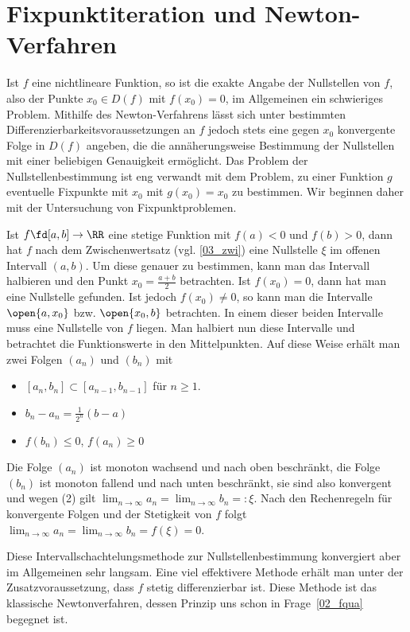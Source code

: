 \section{Fixpunktiteration und Newton-Verfahren}

Ist $f$ eine nichtlineare Funktion, so ist die 
exakte Angabe der Nullstellen von $f$, 
also der Punkte $x_0 \in D(f)$ mit 
$f(x_0)=0$, im Allgemeinen ein schwieriges Problem.  
Mithilfe des Newton-Verfahrens lässt sich unter bestimmten 
Differenzierbarkeitsvoraussetzungen an $f$ jedoch stets eine gegen 
$x_0$ konvergente Folge in $D(f)$ angeben, die die 
annäherungsweise Bestimmung der Nullstellen mit einer beliebigen 
Genauigkeit ermöglicht. Das Problem der Nullstellenbestimmung 
ist eng verwandt mit dem Problem, zu einer Funktion $g$ 
eventuelle Fixpunkte mit $x_0$ mit $g(x_0)=x_0$ zu bestimmen. 
Wir beginnen daher mit der Untersuchung von Fixpunktproblemen. 

Ist $f\fd [a,b] \to \RR$ eine stetige Funktion mit $f(a)<0$ und $f(b)>0$, dann 
hat $f$ nach dem Zwischenwertsatz (vgl. \ref{03_zwi}) eine Nullstelle $\xi$ im offenen 
Intervall $(a,b)$. Um diese genauer zu bestimmen, kann man das Intervall halbieren 
und den Punkt $x_0 = \frac{a+b}{2}$ betrachten. Ist $f(x_0)=0$, dann hat man eine 
Nullstelle gefunden. Ist jedoch $f(x_0) \not=0$, so kann man die Intervalle 
$\open{a,x_0}$ bzw. $\open{x_0, b}$ betrachten. 
In einem dieser beiden Intervalle muss eine Nullstelle von $f$ liegen. 
Man halbiert nun diese Intervalle und betrachtet die Funktionswerte in den 
Mittelpunkten. Auf diese Weise erhält man zwei Folgen 
$(a_n)$ und $(b_n)$ mit 
\begin{itemize}
\item[\desc{1}] $[a_{n},b_{n}] \subset [a_{n-1}, b_{n-1}]$ für $n\ge 1$.
\item[\desc{2}] $b_n-a_n = \frac{1}{2^n} (b-a)$
\item[\desc{3}] $f(b_n) \le 0$, $f(a_n) \ge 0$
\end{itemize}
Die Folge $(a_n)$ ist monoton wachsend und nach oben beschränkt, die Folge $(b_n)$ 
ist monoton fallend und nach unten beschränkt, sie sind also konvergent und 
wegen (2) gilt $\lim_{n\to\infty} a_n = \lim_{n\to\infty} b_n =: \xi$. 
Nach den Rechenregeln für konvergente Folgen und der Stetigkeit von $f$ folgt 
$\lim_{n\to\infty} a_n = \lim_{n\to\infty} b_n = f(\xi) = 0$.  

Diese Intervallschachtelungsmethode zur Nullstellenbestimmung konvergiert aber 
im Allgemeinen sehr langsam. Eine viel effektivere Methode erhält man unter der 
Zusatzvoraussetzung, dass $f$ stetig differenzierbar ist. Diese Methode ist das 
klassische Newtonverfahren, dessen Prinzip uns schon in Frage~\ref{02_fqua}
begegnet ist. 




